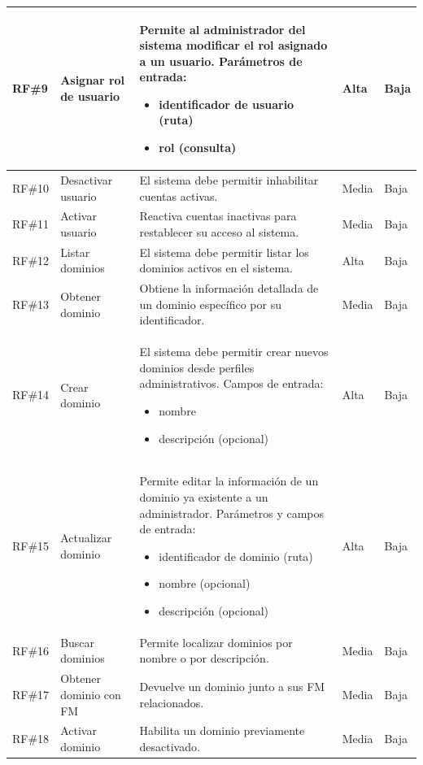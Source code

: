 \begin{longtable}{|p{1cm}|p{4cm}|p{5.2cm}|p{1.9cm}|p{1.9cm}|}
	\hline
    \rowcolor[HTML]{EDEBF1}
	\ac{RF}\#9 & Asignar rol de usuario & Permite al administrador del sistema modificar el rol asignado a un usuario. Parámetros de entrada:
		\begin{itemize}
			\item identificador de usuario (ruta)
			\item rol (consulta)
		\end{itemize}
	& Alta & Baja \\
	\hline
	\ac{RF}\#10 & Desactivar usuario & El sistema debe permitir inhabilitar cuentas activas. & Media & Baja \\
	\hline
    \rowcolor[HTML]{EDEBF1}
	\ac{RF}\#11 & Activar usuario & Reactiva cuentas inactivas para restablecer su acceso al sistema. & Media & Baja \\
	\hline
	\ac{RF}\#12 & Listar dominios & El sistema debe permitir listar los dominios activos en el sistema. & Alta & Baja \\
	\hline
	\rowcolor[HTML]{EDEBF1}
	\ac{RF}\#13 & Obtener dominio & Obtiene la información detallada de un dominio específico por su identificador. & Media & Baja \\
	\hline
	\ac{RF}\#14 & Crear dominio & El sistema debe permitir crear nuevos dominios desde perfiles administrativos. Campos de entrada:
		\begin{itemize}
			\item nombre
			\item descripción (opcional)
		\end{itemize}
	& Alta & Baja \\
	\hline
	\rowcolor[HTML]{EDEBF1}
	\ac{RF}\#15 & Actualizar dominio & Permite editar la información de un dominio ya existente a un administrador. Parámetros y campos de entrada:
		\begin{itemize}
			\item identificador de dominio (ruta)
			\item nombre (opcional)
			\item descripción (opcional)
		\end{itemize}
	& Alta & Baja \\
	\hline
	\ac{RF}\#16 & Buscar dominios & Permite localizar dominios por nombre o por descripción. & Media & Baja \\
	\hline
	\rowcolor[HTML]{EDEBF1}
	\ac{RF}\#17 & Obtener dominio con \ac{FM} & Devuelve un dominio junto a sus \ac{FM} relacionados. & Media & Baja \\
	\hline
	\ac{RF}\#18 & Activar dominio & Habilita un dominio previamente desactivado. & Media & Baja \\

\end{longtable}
